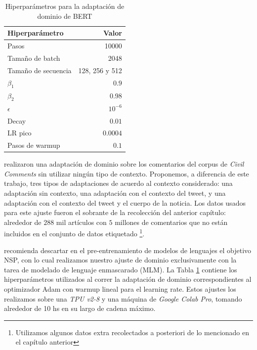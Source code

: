 \begin{table}[t]
    \centering
    \begin{tabular}{lr}
        \toprule
        Hiperparámetro & Valor         \\
        \midrule
        Pasos               & \num{10000}           \\
        Tamaño de batch     & \num{2048}            \\
        Tamaño de secuencia & 128, 256 y 512  \\
        $\beta_1$           & $0.9$           \\
        $\beta_2$           & $0.98$          \\
        $\epsilon$          & $10^{-6}$       \\
        Decay               & $0.01$          \\
        LR pico             & $0.0004$     \\
        Pasos de warmup     & $0.1$             \\
        \bottomrule
    \end{tabular}
    \caption{Hiperparámetros para la adaptación de dominio de BERT}
    \label{tab:hs_ft_hyperparameter}
\end{table}


\citet{pavlopoulos2020toxicity} realizaron una adaptación de dominio sobre los comentarios del corpus de \emph{Civil Comments} sin utilizar ningún tipo de contexto. Proponemos, a diferencia de este trabajo, tres tipos de adaptaciones de acuerdo al contexto considerado: una adaptación sin contexto, una adaptación con el contexto del tweet, y una adaptación con el contexto del tweet y el cuerpo de la noticia. Los datos usados para este ajuste fueron el sobrante de la recolección del anterior capítulo: alrededor de $288$ mil artículos con $5$ millones de comentarios que no están incluidos en el conjunto de datos etiquetado \footnote{Utilizamos algunos datos extra recolectados a posteriori de lo mencionado en el capítulo anterior}.



\citet{liu2019roberta} recomienda descartar en el pre-entrenamiento de modelos de lenguajes el objetivo NSP, con lo cual realizamos nuestro ajuste de dominio exclusivamente con la tarea de modelado de lenguaje enmascarado (MLM). La Tabla \ref{tab:hs_ft_hyperparameter} contiene los hiperparámetros utilizados al correr la adaptación de dominio correspondientes al optimizador Adam con warmup lineal para el learning rate. Estos ajustes los realizamos sobre una \emph{TPU v2-8} y una máquina de \emph{Google Colab Pro}, tomando alrededor de 10 hs en su largo de cadena máximo.

